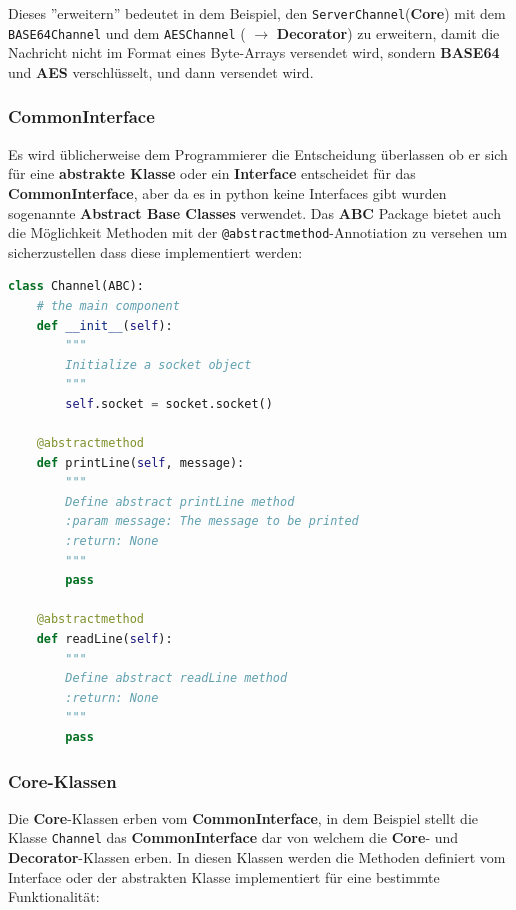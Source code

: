 Dieses ''erweitern'' bedeutet in dem Beispiel, den \verb|ServerChannel|(\textbf{Core}) mit dem \verb|BASE64Channel| und dem \verb|AESChannel| ( $\rightarrow$ \textbf{Decorator}) zu erweitern, damit die Nachricht nicht im Format eines Byte-Arrays versendet wird, sondern \textbf{BASE64} und \textbf{AES} verschlüsselt, und dann versendet wird. 

\subsubsection{CommonInterface}
Es wird üblicherweise dem Programmierer die Entscheidung überlassen ob er sich für eine \textbf{abstrakte Klasse} oder ein \textbf{Interface} entscheidet für das \textbf{CommonInterface}, aber da es in python keine Interfaces gibt wurden sogenannte \textbf{Abstract Base Classes} verwendet. Das \textbf{ABC} Package bietet auch die Möglichkeit Methoden mit der \verb|@abstractmethod|-Annotiation zu versehen um sicherzustellen dass diese implementiert werden:

\begin{lstlisting}[language=Python]
class Channel(ABC):
	# the main component
	def __init__(self):
		"""
		Initialize a socket object
		"""
		self.socket = socket.socket()
	
	@abstractmethod
	def printLine(self, message):
		"""
		Define abstract printLine method
		:param message: The message to be printed
		:return: None
		"""
		pass
	
	@abstractmethod
	def readLine(self):
		"""
		Define abstract readLine method
		:return: None
		"""
		pass
\end{lstlisting}
\subsubsection{Core-Klassen}
Die \textbf{Core}-Klassen erben vom \textbf{CommonInterface}, in dem Beispiel stellt die Klasse \verb|Channel| das \textbf{CommonInterface} dar von welchem die \textbf{Core}- und \textbf{Decorator}-Klassen erben. In diesen Klassen werden die Methoden definiert vom Interface oder der abstrakten Klasse implementiert für eine bestimmte Funktionalität:

